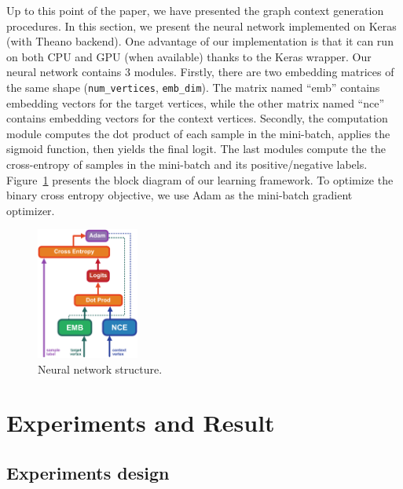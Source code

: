 \documentclass[letterpaper]{article}
\begin{document}
            Up to this point of the paper, we have presented the graph context generation procedures.
            In this section, we present the neural network implemented on Keras \cite{keras} 
            (with Theano \cite{theano} backend). One advantage of our implementation is that
            it can run on both CPU and GPU (when available) thanks to the Keras wrapper. Our
            neural network contains 3 modules. Firstly, there are two embedding matrices of 
            the same shape (\texttt{num\_vertices}, \texttt{emb\_dim}). The matrix named ``emb''
            contains embedding vectors for the target vertices, while the other matrix named
            ``nce'' contains embedding vectors for the context vertices. Secondly, the computation
            module computes the dot product of each sample in the mini-batch, applies the
            sigmoid function, then yields the final logit. The last modules compute the
            the cross-entropy \cite{xentropy} of samples in the mini-batch and its positive/negative
            labels. Figure~\ref{fig:mage} presents the block diagram of our learning framework.
            To optimize the binary cross entropy objective, we use Adam \cite{adam} as the 
            mini-batch gradient optimizer.
            
            \begin{figure}
                \centering
                \includegraphics[width=0.3\textwidth]{fig8_nn}
                \caption{Neural network structure.}
                \label{fig:mage}
            \end{figure}

    \section{Experiments and Result}

        \subsection{Experiments design}
            
\end{document}

